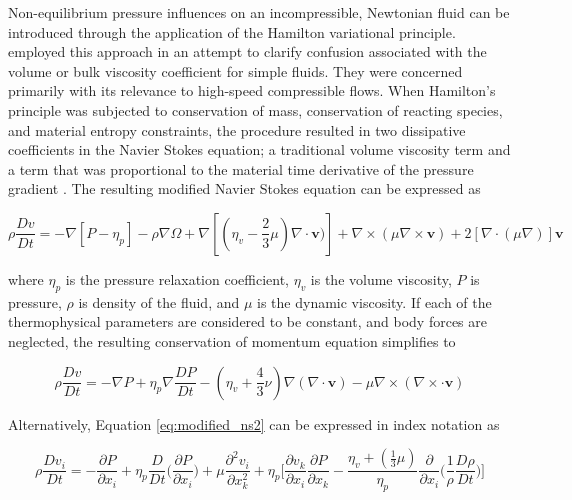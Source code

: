 Non-equilibrium pressure influences on an incompressible, Newtonian fluid can 
be introduced through the application of the Hamilton variational principle.
\cite{zuckerwar2006} employed this approach in an attempt to clarify confusion 
associated with the volume or bulk viscosity coefficient for simple fluids. 
They were concerned primarily with its relevance to high-speed compressible 
flows. When Hamilton's principle was subjected to conservation of mass, 
conservation of reacting species, and material entropy constraints, the 
procedure resulted in 
two dissipative coefficients in the Navier Stokes equation; a traditional 
volume viscosity term and a term that was proportional to the material time 
derivative of the pressure gradient \cite{zuckerwar2009}. The resulting 
modified Navier Stokes equation can be expressed as

\begin{equation}
\rho \frac{Dv}{Dt} = - \nabla[P - \eta_p] -
\rho \nabla \Omega + 
\nabla[(\eta_v - \frac{2}{3} \mu)\nabla \cdot \pmb{\text{v}})] + 
\nabla \times (\mu \nabla \times \pmb{\text{v}}) + 
2[\nabla \cdot (\mu \nabla)] \pmb{\text{v}}
\label{eq:modified_ns1}
\end{equation}

\noindent
where $\eta_p$ is the pressure relaxation coefficient, $\eta_v$ is the volume 
viscosity, $P$ is pressure, $\rho$ is density of the fluid, and $\mu$ is the 
dynamic viscosity. If each of the thermophysical parameters are considered 
to be constant, and body forces are 
neglected, the resulting conservation of momentum equation simplifies to 

\begin{equation}
\rho \frac{Dv}{Dt} = - \nabla P + \eta_p \nabla \frac{DP}{Dt} - 
(\eta_v + \frac{4}{3}\nu) \nabla (\nabla \cdot\pmb{\text{v}})
- \mu \nabla \times (\nabla \times \cdot\pmb{\text{v}})
\label{eq:modified_ns2}
\end{equation}

\noindent
Alternatively, Equation \ref{eq:modified_ns2} can be expressed in index 
notation as 

\begin{equation}
\rho \frac{Dv_i}{Dt} = -\frac{\partial P}{\partial x_i} +
\eta_p \frac{D}{Dt} \Bigg( \frac{\partial P}{\partial x_i} \Bigg) + 
\mu \frac{\partial^2 v_i}{\partial x_{k}^2} + 
\eta_p \Bigg[\frac{\partial v_k}{\partial x_i} \frac{\partial P}{\partial x_k} -
\frac{\eta_v + (\frac{1}{3}\mu)}{\eta_p} \frac{\partial}{\partial 
x_i} \Bigg( \frac{1}{\rho} \frac{D\rho}{Dt} \Bigg) \Bigg]
\label{eq:modified_ns3}
\end{equation}

